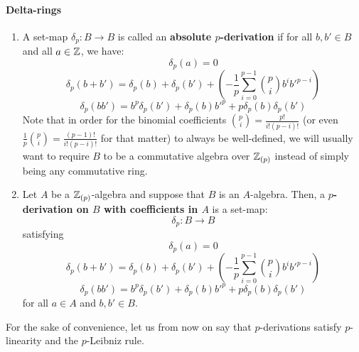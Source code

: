                 \paragraph{Delta-rings}
                    \begin{definition}[$p$-derivations] \label{def: p_derivations}
                        \noindent
                        \begin{enumerate}
                            \item A set-map $\delta_p: B \to B$ is called an \textbf{absolute $p$-derivation} if for all $b, b' \in B$ and all $a \in \mathbb{Z}$, we have:
                                $$\delta_p(a) = 0$$
                                $$\delta_p(b + b') = \delta_p(b) + \delta_p(b') + \left(-\frac1p\sum_{i=0}^{p-1} \binom{p}{i} b^ib'^{p-i}\right)$$
                                $$\delta_p(bb') = b^p\delta_p(b') + \delta_p(b)b'^p + p\delta_p(b)\delta_p(b')$$
                            Note that in order for the binomial coefficients $\binom{p}{i} = \frac{p!}{i! (p - i)!}$ (or even $\frac1p \binom{p}{i} = \frac{(p - 1)!}{i! (p - i)!}$ for that matter) to always be well-defined, we will usually want to require $B$ to be a commutative algebra over $\mathbb{Z}_{(p)}$ instead of simply being any commutative ring. 
                            \item Let $A$ be a $\mathbb{Z}_{(p)}$-algebra and suppose that $B$ is an $A$-algebra. Then, a \textbf{$p$-derivation on $B$ with coefficients in $A$} is a set-map:
                                $$\delta_p: B \to B$$
                            satisfying
                                $$\delta_p(a) = 0$$
                                $$\delta_p(b + b') = \delta_p(b) + \delta_p(b') + \left(-\frac1p\sum_{i=0}^{p-1} \binom{p}{i} b^ib'^{p-i}\right)$$
                                $$\delta_p(bb') = b^p\delta_p(b') + \delta_p(b)b'^p + p\delta_p(b)\delta_p(b')$$
                            for all $a \in A$ and $b, b' \in B$.
                        \end{enumerate}
                    \end{definition}
                    \begin{convention}
                        For the sake of convenience, let us from now on say that $p$-derivations satisfy $p$-linearity and the $p$-Leibniz rule.
                    \end{convention}
                    
